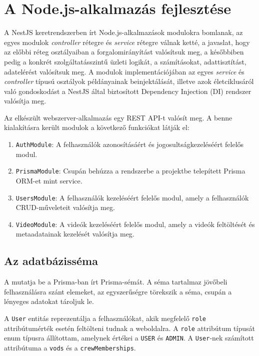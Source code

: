 \section{A Node.js-alkalmazás fejlesztése}

A NestJS keretrendszerben írt Node.js-alkalmazások modulokra bomlanak, az egyes modulok \emph{controller} rétegre és \emph{service} rétegre válnak ketté, a javaslat, hogy az előbbi réteg osztályaiban a forgalomirányítást valósítsuk meg, a későbbiben pedig a konkrét szolgáltatásszintű üzleti logikát, a számításokat, adattisztítást, adatelérést valósítsuk meg. A modulok implementációjában az egyes \emph{service} és \emph{controller} típusú osztályok példányainak beinjektálását, illetve azok életciklusáról való gondoskodást a NestJS által biztosított Dependency Injection (DI) rendszer valósítja meg.

Az elkészült webszerver-alkalmazás egy REST API-t valósít meg. A benne kialakításra került modulok a következő funkciókat látják el:

\begin{enumerate}
  \item \verb|AuthModule|: A felhasználók azonosításáért és jogosultságkezeléséért felelős modul.
  \item \verb|PrismaModule|: Csupán behúzza a rendszerbe a projektbe telepített Prisma ORM-et mint service.
  \item \verb|UsersModule|: A felhasználók kezeléséért felelős modul, amely a felhasználók CRUD-műveleteit valósítja meg.
  \item \verb|VideoModule|: A videók kezeléséért felelős modul, amely a videók feltöltését és metaadatainak kezelését valósítja meg.
\end{enumerate}

\subsection{Az adatbázisséma}

A  mutatja be a Prisma-ban írt Prisma-sémát. A séma tartalmaz jövőbeli felhasználásra szánt elemeket, az egyszerűségre törekszik a séma, csupán a lényeges adatokat tároljuk le.

A \verb|User| entitás reprezentálja a felhasználókat, akik megfelelő \verb|role| attribútumérték esetén feltölteni tudnak a weboldalra. A \verb|role| attribútum típusát enum típusra állítottam, amelynek értékei a \verb|USER| és \verb|ADMIN|. A \verb|User|-nek számított attribútuma a \verb|vods| és a \verb|crewMemberships|.

